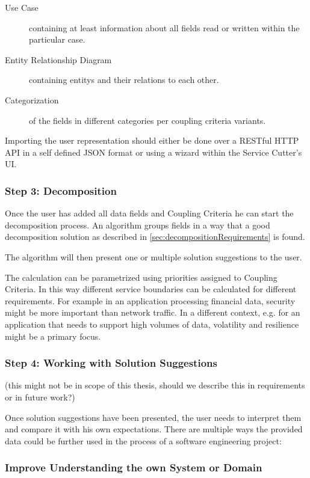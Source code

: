 \begin{description}
	\item[Use Case] containing at least information about all fields read or written within the particular case. 
		\item[Entity Relationship Diagram] containing \glspl{entity} and their relations to each other. 
	\item[Categorization] of the fields in different categories per coupling criteria variants. 
\end{description}

Importing the user representation should either be done over a RESTful HTTP API in a self defined JSON format or using a wizard within the Service Cutter's \gls{UI}.

\subsubsection{Step 3: Decomposition}

Once the user has added all data fields and Coupling Criteria he can start the decomposition process. An algorithm groups fields in a way that a good decomposition solution as described in \ref{sec:decompositionRequirements} is found. 

The algorithm will then present one or multiple solution suggestions to the user.

The calculation can be parametrized using priorities assigned to Coupling Criteria. In this way different service boundaries can be calculated for different requirements. For example in an application processing financial data, security might be more important than network traffic. In a different context, e.g. for an application that needs to support high volumes of data, volatility and resilience might be a primary focus.

\subsubsection{Step 4: Working with Solution Suggestions}

(this might not be in scope of this thesis, should we describe this in requirements or in future work?)

Once solution suggestions have been presented, the user needs to interpret them and compare it with his own expectations. There are multiple ways the provided data could be further used in the process of a software engineering project:

\subsubsection{Improve Understanding the own System or Domain}

